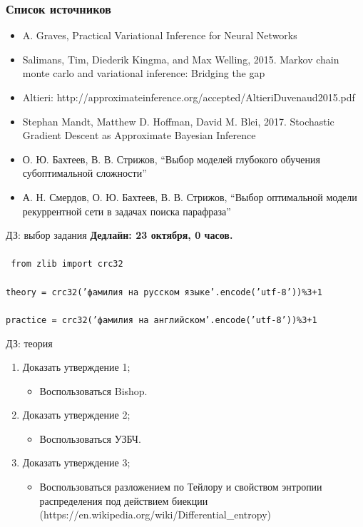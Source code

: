 \documentclass[usenames,dvipsnames,10pt,pdf,utf8,russian,aspectratio=43]{beamer}
\begin{document}
\begin{frame}
\frametitle{Список источников}
\begin{itemize}
\item A. Graves, Practical Variational Inference for Neural Networks
\item Salimans, Tim, Diederik Kingma, and Max Welling, 2015. Markov chain monte carlo and variational inference: Bridging the gap
\item Altieri: http://approximateinference.org/accepted/AltieriDuvenaud2015.pdf
\item Stephan Mandt, Matthew D. Hoffman, David M. Blei, 2017. Stochastic Gradient Descent as Approximate Bayesian Inference
\item О. Ю. Бахтеев, В. В. Стрижов, “Выбор моделей глубокого обучения субоптимальной сложности”
\item А. Н. Смердов, О. Ю. Бахтеев, В. В. Стрижов, “Выбор оптимальной модели рекуррентной сети в задачах поиска парафраза”
\end{itemize}
\end{frame}

\begin{frame}{ДЗ: выбор задания}
\textbf{Дедлайн: 23 октября, 0 часов.}\\~\\

\texttt{ from zlib import crc32}\\~\\
\texttt{theory = crc32('фамилия на русском языке'.encode('utf-8'))\%3+1}\\~\\
\texttt{practice = crc32('фамилия на английском'.encode('utf-8'))\%3+1}
\end{frame}

\begin{frame}{ДЗ: теория}
\begin{enumerate}
\item Доказать утверждение 1;
\begin{itemize}
\item Воспользоваться Bishop.
\end{itemize}

\item Доказать утверждение 2;
\begin{itemize}
\item Воспользоваться УЗБЧ.
\end{itemize}

\item Доказать утверждение 3;
\begin{itemize}
\item Воспользоваться разложением по Тейлору и свойством энтропии распределения под действием биекции (https://en.wikipedia.org/wiki/Differential\_entropy)
\end{itemize}
\end{enumerate}
\end{frame}
\end{document}

